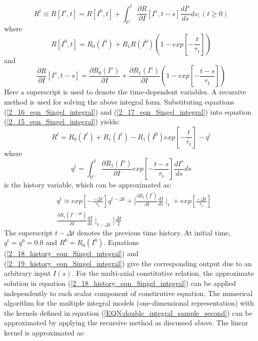 \begin{equation}
R^t \equiv R[I^s,t]=R[I^0,t]+\int_{0^+}^{t} \frac{\partial R}{\partial I}[I^s,t-s] \frac{d I^s}{d s} ds 
; (t \geq 0)
\label{2_15_eqn_Singel_integral}
\end{equation}
where
\begin{equation}
R[I^0,t]=R_0(I^0)+R_1 R(I^0) \left(1-exp \left[-\frac{t}{\tau_1} \right] \right)
\label{2_16_eqn_Singel_integral}
\end{equation}
and
\begin{equation}
\frac{\partial R}{\partial I}[I^s,t-s]=\frac{\partial R_0(I^s)}{\partial I}+\frac{\partial R_1(I^s)}{\partial I}
\left(1-exp \left[-\frac{t-s}{\tau_1} \right] \right)
\label{2_17_eqn_Singel_integral}
\end{equation}
Here a superscript is used to denote the time-dependent variables. 
A recursive method is used for solving the above integral form. 
Substituting equations (\ref{2_16_eqn_Singel_integral}) and (\ref{2_17_eqn_Singel_integral}) into equation (\ref{2_15_eqn_Singel_integral}) yields:
\begin{equation}
R^t=R_0(I^t)+R_1(I^t)-R_1(I^0) exp \left[-\frac{t}{\tau_1} \right]-q^t
\label{2_18_history_eqn_Singel_integral}
\end{equation}
where
\begin{equation}
q^t=\int_{0^+}^{t} \frac{\partial R_1 (I^s) }{\partial I} exp \left[-\frac{t-s}{\tau_1} \right] \frac{d I^s}{d s} ds
\label{2_19_history_eqn_Singel_integral}
\end{equation}
is the history variable, which can be approximated as: 
\begin{equation}
\begin{aligned}
&q^t \approx  exp \left[-\frac{-\Delta t}{\tau_1} \right] q^{t-\Delta t}+ 
\Big[\frac{\partial R_1 (I^t) } {\partial I} \frac{d I}{d s} \mid_t
+exp \left[ \frac{-\Delta t}{\tau_1} \right] \\  
&\frac{\partial R_1 (I^{t-\Delta t}) } {\partial I} \frac{d I}{d s} \mid_{t-\Delta t} \Big] \frac{\Delta t}{2}
\end{aligned}
\label{2_20_EQN:single_integral_history_variables}
\end{equation}
The superscript $t-\Delta t$ denotes the previous time history. 
At initial time, $q^t=q^0=0.0$ and $R^0=R_0(I^0)$. Equations (\ref{2_18_history_eqn_Singel_integral}) and (\ref{2_19_history_eqn_Singel_integral}) give the corresponding output due to an arbitrary input $I(s)$.
For the multi-axial constitutive relation, the approximate solution in equation (\ref{2_18_history_eqn_Singel_integral}) can be applied independently to each scalar component of constirutive equation.
The numerical algorithm for the multiple integral models (one-dimensional representation) with the kernels defined in equation (\ref{EQN:double_integral_sample_second}) can be approximated by applying the recursive method as discussed above. 
The linear kernel is approximated as:

